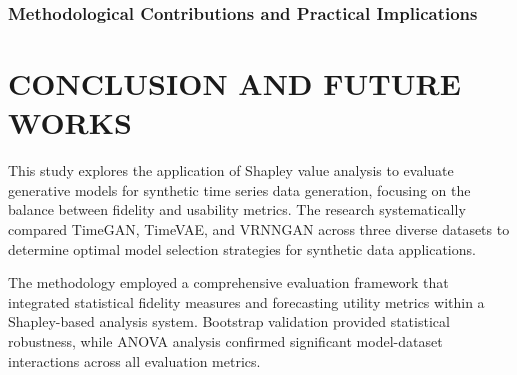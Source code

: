 \documentclass{article}
\begin{document}
\subsubsection{Methodological Contributions and Practical Implications}



\newpage
\section{CONCLUSION AND FUTURE WORKS}
This study explores the application of Shapley value analysis to evaluate generative models for synthetic time series data generation, focusing on the balance between fidelity and usability metrics. The research systematically compared TimeGAN, TimeVAE, and VRNNGAN across three diverse datasets to determine optimal model selection strategies for synthetic data applications. 

The methodology employed a comprehensive evaluation framework that integrated statistical fidelity measures and forecasting utility metrics within a Shapley-based analysis system. Bootstrap validation provided statistical robustness, while ANOVA analysis confirmed significant model-dataset interactions across all evaluation metrics.
\end{document}
